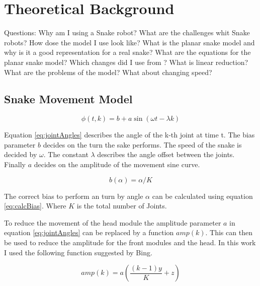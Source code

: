 \chapter{Theoretical Background}
\label{section:theory}





Questions:
Why am I using a Snake robot?
What are the challenges whit Snake robots?
How dose the model I use look like?
What is the planar snake model and why is it a good representation for a real snake?
What are the equations for the planar snake model?
Which changes did I use from \cite{Bing}?
What is linear reduction?
What are the problems of the model?
What about changing speed?





\section{Snake Movement Model}




\begin{equation} \label{eq:jointAngles}
\phi\left(t, k\right) = b + a \sin \left(\omega t - \lambda k\right)
\end{equation}

Equation \ref{eq:jointAngles} describes the angle of the k-th joint at time t. The bias parameter $ b $ decides on the turn the sake performs. The speed of the snake is decided by $ \omega$. The constant $\lambda $ describes the angle offset between the joints. Finally $ a $ decides on the amplitude of the movement sine curve.

\begin{equation} \label{eq:calcBias}
b\left(\alpha\right) = \alpha / K
\end{equation}

The correct bias to perform an turn by angle $ \alpha $ can be calculated using equation \ref{eq:calcBias}. Where $ K $ is the total number of Joints.

To reduce the movement of the head module the amplitude parameter $ a $ in equation \ref{eq:jointAngles} can be replaced by a function $amp\left(k\right)$. This can then be used to reduce the amplitude for the front modules and the head. In this work I used the following function suggested by Bing\cite{Bing}.

\begin{equation}\label{eq:amp}
amp\left(k\right) = a \left(\frac{\left(k - 1\right) y}{K} + z\right)
\end{equation}

